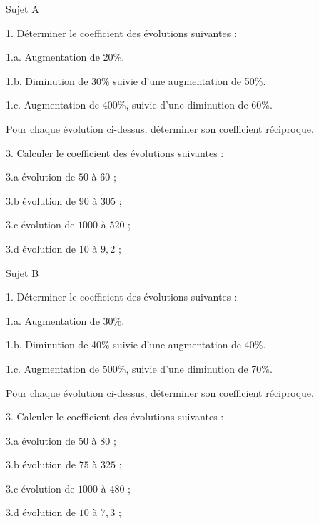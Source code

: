 \documentclass{beamer}
\begin{document}
\small

\begin{frame}
	\setlength{\columnseprule}{0.7pt}
	\begin{multicols}{2}
		\uline{Sujet A}\vspace{1em}

		{\color{blue} 1.} Déterminer le coefficient des évolutions suivantes :\vspace{0.5em}

		{\color{blue} 1.a.} Augmentation de 20\%.

		{\color{blue} 1.b.} Diminution de 30\% suivie d'une augmentation de 50\%.

		{\color{blue} 1.c.} Augmentation de 400\%, suivie d'une diminution de 60\%.

		 Pour chaque évolution ci-dessus, déterminer son coefficient réciproque.\vspace{0.5em}

		{\color{blue} 3.} Calculer le coefficient des évolutions suivantes :

		{\color{blue} 3.a} évolution de $50$ à $60$ ;

		{\color{blue} 3.b} évolution de $90$ à $305$ ;

		{\color{blue} 3.c} évolution de $1000$ à $520$ ;

		{\color{blue} 3.d} évolution de $10$ à $9,2$ ;

		\columnbreak

		\uline{Sujet B}\vspace{1em}

		{\color{blue} 1.} Déterminer le coefficient des évolutions suivantes :\vspace{0.5em}

		{\color{blue} 1.a.} Augmentation de 30\%.

		{\color{blue} 1.b.} Diminution de 40\% suivie d'une augmentation de 40\%.

		{\color{blue} 1.c.} Augmentation de 500\%, suivie d'une diminution de 70\%.

		 Pour chaque évolution ci-dessus, déterminer son coefficient réciproque.\vspace{0.5em}

		{\color{blue} 3.} Calculer le coefficient des évolutions suivantes :

		{\color{blue} 3.a} évolution de $50$ à $80$ ;

		{\color{blue} 3.b} évolution de $75$ à $325$ ;

		{\color{blue} 3.c} évolution de $1000$ à $480$ ;

		{\color{blue} 3.d} évolution de $10$ à $7,3$ ;
	\end{multicols}
\end{frame}
\end{document}
